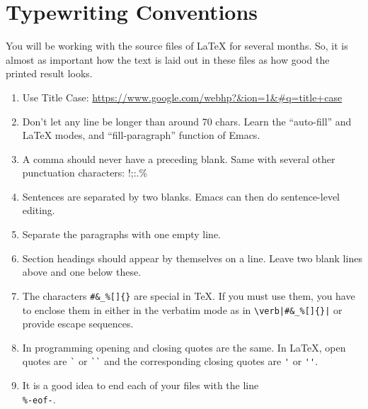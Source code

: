 \chapter{Typewriting Conventions}

You will be working with the source files of LaTeX for several months.
So, it is almost as important how the text is laid out in these files
as how good the printed result looks.

\begin{enumerate}
\item
Use Title Case: \url{https://www.google.com/webhp?&ion=1&#q=title+case}

\item
Don't let any line be longer than around 70 chars.  Learn the
``auto-fill'' and LaTeX modes, and ``fill-paragraph'' function of
Emacs.

\item
A comma should never have a preceding blank.  Same with several other
punctuation characters: !;:.\%

\item
Sentences are separated by two blanks.  Emacs can then do
sentence-level editing.

\item
Separate the paragraphs with one empty line.

\item
Section headings should appear by themselves on a line.  Leave two blank
lines above and one below these.

\item
The characters \verb|#&_%[]{}| are special in {\TeX}.  If you must use
them, you have to enclose them in either in the verbatim mode as in
\verb/\verb|#&_%[]{}|/ or provide escape sequences.

\item
In programming opening and closing quotes are the same.  In \LaTeX{},
open quotes are \verb|`| or \verb|``| and the corresponding closing
quotes are \verb|'| or \verb|''|.

\item
It is a good idea to end each of your files with the line \\
\verb|%-eof-|.
\end{enumerate}


